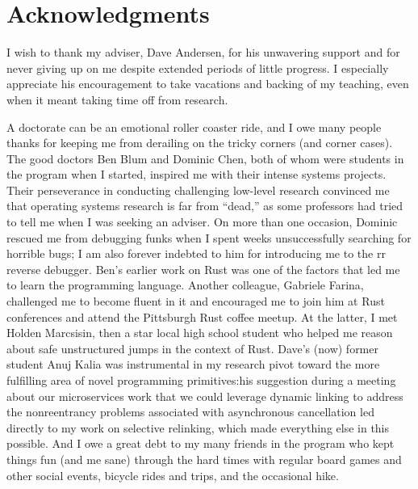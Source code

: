 \chapter{Acknowledgments}

I wish to thank my adviser, Dave Andersen, for his unwavering support and for never
giving up on me despite extended periods of little progress.  I especially appreciate
his encouragement to take vacations and backing of my teaching, even when it meant
taking time off from research.

A doctorate can be an emotional roller coaster ride, and I owe many people thanks for
keeping me from derailing on the tricky corners (and corner cases).  The good doctors
Ben Blum and Dominic Chen, both of whom were students in the program when I started,
inspired me with their intense systems projects.  Their perseverance in conducting
challenging low-level research convinced me that operating systems research is far
from ``dead,'' as some professors had tried to tell me when I was seeking an adviser.
On more than one occasion, Dominic rescued me from debugging funks when I spent weeks
unsuccessfully searching for horrible bugs; I am also forever indebted to him for
introducing me to the rr reverse debugger.  Ben's earlier work on Rust was one of the
factors that led me to learn the programming language.  Another colleague, Gabriele
Farina, challenged me to become fluent in it and encouraged me to join him at Rust
conferences and attend the Pittsburgh Rust coffee meetup.  At the latter, I met
Holden Marcsisin, then a star local high school student who helped me reason about
safe unstructured jumps in the context of Rust.  Dave's (now) former student Anuj
Kalia was instrumental in my research pivot toward the more fulfilling area of novel
programming primitives:\@ his suggestion during a meeting about our microservices
work that we could leverage dynamic linking to address the nonreentrancy problems
associated with asynchronous cancellation led directly to my work on selective
relinking, which made everything else in this \thesis possible.  And I owe a great
debt to my many friends in the program who kept things fun (and me sane) through the
hard times with regular board games and other social events, bicycle rides and trips,
and the occasional hike.

